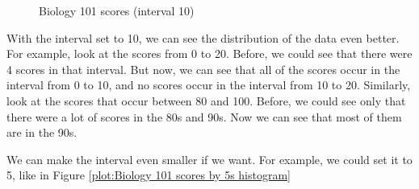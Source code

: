 \documentclass[../../../main.tex]{subfiles}
\begin{document}
\begin{figure}[ht]
  \caption{\label{plot:Biology 101 scores by 10s histogram} Biology 101 scores (interval 10)}
\end{figure}

With the interval set to 10, we can see the distribution of the data even better. For example, look at the scores from 0 to 20. Before, we could see that there were 4 scores in that interval. But now, we can see that all of the scores occur in the interval from 0 to 10, and no scores occur in the interval from 10 to 20. Similarly, look at the scores that occur between 80 and 100. Before, we could see only that there were a lot of scores in the 80s and 90s. Now we can see that most of them are in the 90s.

We can make the interval even smaller if we want. For example, we could set it to 5, like in Figure \ref{plot:Biology 101 scores by 5s histogram}
\end{document}
